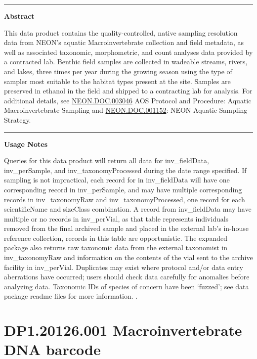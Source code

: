 \documentclass[]{article}
\begin{document}
\begin{center}\rule{0.5\linewidth}{\linethickness}\end{center}

\textbf{Abstract}

This data product contains the quality-controlled, native sampling
resolution data from NEON's aquatic Macroinvertebrate collection and
field metadata, as well as associated taxonomic, morphometric, and count
analyses data provided by a contracted lab. Benthic field samples are
collected in wadeable streams, rivers, and lakes, three times per year
during the growing season using the type of sampler most suitable to the
habitat types present at the site. Samples are preserved in ethanol in
the field and shipped to a contracting lab for analysis. For additional
details, see
\href{http://data.neonscience.org/api/v0/documents/NEON.DOC.003046vB}{NEON.DOC.003046}
AOS Protocol and Procedure: Aquatic Macroinvertebrate Sampling and
\href{http://data.neonscience.org/api/v0/documents/NEON.DOC.001152vA}{NEON.DOC.001152}:
NEON Aquatic Sampling Strategy.

\begin{center}\rule{0.5\linewidth}{\linethickness}\end{center}

\textbf{Usage Notes}

Queries for this data product will return all data for inv\_fieldData,
inv\_perSample, and inv\_taxonomyProcessed during the date range
specified. If sampling is not impractical, each record for in
inv\_fieldData will have one corresponding record in inv\_perSample, and
may have multiple corresponding records in inv\_taxonomyRaw and
inv\_taxonomyProcessed, one record for each scientificName and sizeClass
combination. A record from inv\_fieldData may have multiple or no
records in inv\_perVial, as that table represents individuals removed
from the final archived sample and placed in the external lab's in-house
reference collection, records in this table are opportunistic. The
expanded package also returns raw taxonomic data from the external
taxonomist in inv\_taxonomyRaw and information on the contents of the
vial sent to the archive facility in inv\_perVial. Duplicates may exist
where protocol and/or data entry aberrations have occurred; users should
check data carefully for anomalies before analyzing data. Taxonomic IDs
of species of concern have been `fuzzed'; see data package readme files
for more information. \newpage
.

\section{DP1.20126.001 Macroinvertebrate DNA
barcode}\label{dp1.20126.001-macroinvertebrate-dna-barcode}
\end{document}
